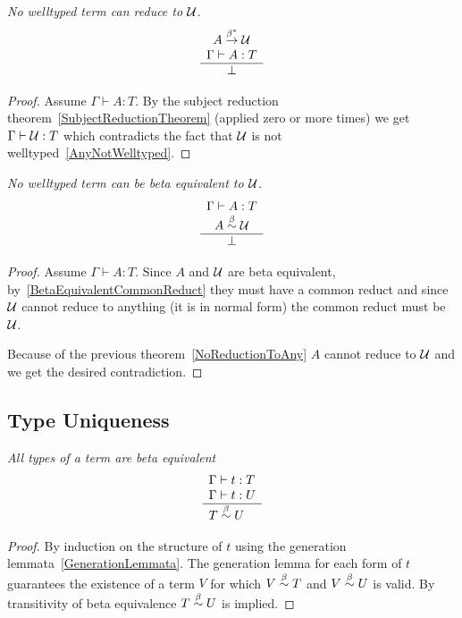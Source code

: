 \begin{corollary}
    \label{NoReductionToAny}
    \emph{No welltyped term can reduce to ${\cal U}$}.
    $$
    \begin{array}{c} 
        A \stackrel{\beta^*}{\to} {\cal U}
        \\
        \Gamma \vdash A: T
     \\ \hline 
        \perp
    \end{array}
    $$
    \begin{proof}
        Assume $\Gamma \vdash A : T$. By the subject reduction
        theorem~\ref{SubjectReductionTheorem} (applied zero or more times) we
        get $\Gamma \vdash {\cal U} : T$ which contradicts the fact that ${\cal U}$ is
        not welltyped~\ref{AnyNotWelltyped}.
    \end{proof}
\end{corollary}





\begin{corollary}
    \label{NoEquivalentToAny}
    \emph{No welltyped term can be beta equivalent to ${\cal U}$}.
    $$
    \begin{array}{c} 
        \Gamma \vdash A: T
        \\
        A \stackrel{\beta}{\sim} {\cal U}
     \\ \hline 
        \perp
    \end{array}
    $$
    \begin{proof}
        Assume $\Gamma \vdash A: T$. Since $A$ and ${\cal U}$ are beta equivalent,
        by~\ref{BetaEquivalentCommonReduct} they must have a common reduct and
        since ${\cal U}$ cannot reduce to anything (it is in normal form) the common
        reduct must be ${\cal U}$.

        Because of the previous theorem~\ref{NoReductionToAny} $A$ cannot
        reduce to ${\cal U}$ and we get the desired contradiction.
    \end{proof}
\end{corollary}





\subsection{Type Uniqueness}


\begin{theorem}
    \label{TypeUniqueness1}
    \emph{All types of a term are beta equivalent}
    $$
    \begin{array}{l} 
        \Gamma \vdash t : T
        \\
        \Gamma \vdash t : U
     \\ \hline 
        T \stackrel{\beta}{\sim} U
    \end{array}
    $$

    \begin{proof}
        By induction on the structure of $t$ using the generation
        lemmata~\ref{GenerationLemmata}. The generation lemma for each form of
        $t$ guarantees the existence of a term $V$ for which $V \stackrel{\beta}{\sim} T$ and
        $V \stackrel{\beta}{\sim} U$ is valid. By transitivity of beta equivalence $T \stackrel{\beta}{\sim}
        U$ is implied.
    \end{proof}
\end{theorem}



